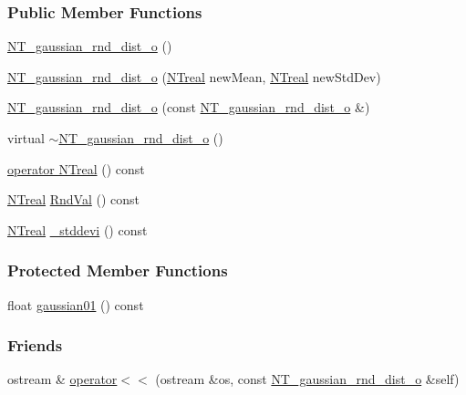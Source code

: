 \subsubsection*{Public Member Functions}
\begin{DoxyCompactItemize}
\item 
\hyperlink{class_n_t__gaussian__rnd__dist__o_abd0a8bde6e73e7cd68c82fd059d1e1ae}{NT\_\-gaussian\_\-rnd\_\-dist\_\-o} ()
\item 
\hyperlink{class_n_t__gaussian__rnd__dist__o_a1b9b3aac242228e1318f256cd95653f2}{NT\_\-gaussian\_\-rnd\_\-dist\_\-o} (\hyperlink{nt__types_8h_a814a97893e9deb1eedcc7604529ba80d}{NTreal} newMean, \hyperlink{nt__types_8h_a814a97893e9deb1eedcc7604529ba80d}{NTreal} newStdDev)
\item 
\hyperlink{class_n_t__gaussian__rnd__dist__o_ab6c3beec6162cf19f0516951746e9127}{NT\_\-gaussian\_\-rnd\_\-dist\_\-o} (const \hyperlink{class_n_t__gaussian__rnd__dist__o}{NT\_\-gaussian\_\-rnd\_\-dist\_\-o} \&)
\item 
virtual \hyperlink{class_n_t__gaussian__rnd__dist__o_a7735dd9c6f0bb0ec8bed32fe13d420b6}{$\sim$NT\_\-gaussian\_\-rnd\_\-dist\_\-o} ()
\item 
\hyperlink{class_n_t__gaussian__rnd__dist__o_ab14f2d1be8e1fb1682c25d99e3104ede}{operator NTreal} () const 
\item 
\hyperlink{nt__types_8h_a814a97893e9deb1eedcc7604529ba80d}{NTreal} \hyperlink{class_n_t__gaussian__rnd__dist__o_ac3e5cb21eeedf835ce4bb23f05bbcc55}{RndVal} () const 
\item 
\hyperlink{nt__types_8h_a814a97893e9deb1eedcc7604529ba80d}{NTreal} \hyperlink{class_n_t__gaussian__rnd__dist__o_a30481ca951c240da4ea14ef7aab956a8}{\_\-stddevi} () const 
\end{DoxyCompactItemize}
\subsubsection*{Protected Member Functions}
\begin{DoxyCompactItemize}
\item 
float \hyperlink{class_n_t__gaussian__rnd__dist__o_accb215ca698eeab1f1f1823f34972424}{gaussian01} () const 
\end{DoxyCompactItemize}
\subsubsection*{Friends}
\begin{DoxyCompactItemize}
\item 
ostream \& \hyperlink{class_n_t__gaussian__rnd__dist__o_a4b3f9071c8d0e4f2904197e32f2e703c}{operator$<$$<$} (ostream \&os, const \hyperlink{class_n_t__gaussian__rnd__dist__o}{NT\_\-gaussian\_\-rnd\_\-dist\_\-o} \&self)
\end{DoxyCompactItemize}



